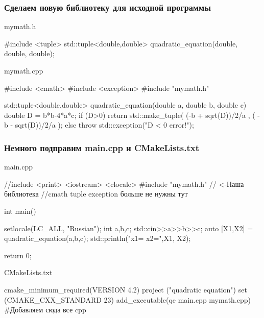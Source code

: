 \documentclass[9pt, aspectratio=1610]{beamer}
\begin{document}
\begin{frame}[fragile]\frametitle{Сделаем новую библиотеку для исходной программы}
	
	\begin{block}{mymath.h}
		\begin{cppcode}
			#include <tuple>
			std::tuple<double,double> quadratic_equation(double, double, double);
		\end{cppcode}
	\end{block}
	
	\begin{block}{mymath.cpp}
		\begin{cppcode}
			#include <cmath>
			#include <exception>
			#include "mymath.h"
			
			std::tuple<double,double> quadratic_equation(double a, double b, double c)
			{
				double D = b*b-4*a*c;
				if (D>0)
				return std::make_tuple(  (-b + sqrt(D))/2/a , ( -b - sqrt(D))/2/a  );
				else 
				throw std::exception("D < 0 error!");
			}
		\end{cppcode}
	\end{block}
	
\end{frame}

\begin{frame}[fragile]\frametitle{Немного подправим main.cpp и CMakeLists.txt}
	
	\begin{block}{main.cpp}
		\begin{cppcode}
			//include <print> <iostream> <clocale>
			#include "mymath.h" // <-Наша библиотека
			//cmath tuple exception   больше не нужны тут
			
			int main()
			{
				setlocale(LC_ALL, "Russian");
				int a,b,c;
				std::cin>>a>>b>>c;
				auto [X1,X2] = quadratic_equation(a,b,c);
				std::println("x1={} x2={}",X1, X2);
				
				return 0;
			}
		\end{cppcode}
	\end{block}
	
	\begin{block}{CMakeLists.txt}
		\begin{cmakecode}
			cmake_minimum_required(VERSION 4.2)
			project ("quadratic equation")
			set (CMAKE_CXX_STANDARD 23)
			add_executable(qe main.cpp mymath.cpp) #Добавляем сюда все cpp
		\end{cmakecode}
	\end{block}
	
\end{frame}
\end{document}

